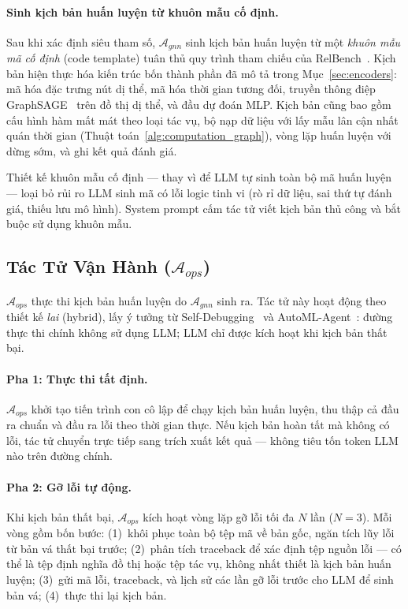 \paragraph{Sinh kịch bản huấn luyện từ khuôn mẫu cố định.}
Sau khi xác định siêu tham số, $\mathcal{A}_{gnn}$ sinh kịch bản huấn luyện từ một \textit{khuôn mẫu mã cố định} (code template) tuân thủ quy trình tham chiếu của RelBench~\cite{robinson2024relbench}. Kịch bản hiện thực hóa kiến trúc bốn thành phần đã mô tả trong Mục~\ref{sec:encoders}: mã hóa đặc trưng nút dị thể, mã hóa thời gian tương đối, truyền thông điệp GraphSAGE~\cite{hamilton2017inductive} trên đồ thị dị thể, và đầu dự đoán MLP. Kịch bản cũng bao gồm cấu hình hàm mất mát theo loại tác vụ, bộ nạp dữ liệu với lấy mẫu lân cận nhất quán thời gian (Thuật toán~\ref{alg:computation_graph}), vòng lặp huấn luyện với dừng sớm, và ghi kết quả đánh giá.

Thiết kế khuôn mẫu cố định --- thay vì để LLM tự sinh toàn bộ mã huấn luyện --- loại bỏ rủi ro LLM sinh mã có lỗi logic tinh vi (rò rỉ dữ liệu, sai thứ tự đánh giá, thiếu lưu mô hình). System prompt cấm tác tử viết kịch bản thủ công và bắt buộc sử dụng khuôn mẫu.

\subsection{Tác Tử Vận Hành ($\mathcal{A}_{ops}$)}
\label{sec:operation-agent}

$\mathcal{A}_{ops}$ thực thi kịch bản huấn luyện do $\mathcal{A}_{gnn}$ sinh ra. Tác tử này hoạt động theo thiết kế \textit{lai} (hybrid), lấy ý tưởng từ Self-Debugging~\cite{chen2024selfdebugging} và AutoML-Agent~\cite{trirat2025automl}: đường thực thi chính không sử dụng LLM; LLM chỉ được kích hoạt khi kịch bản thất bại.

\paragraph{Pha 1: Thực thi tất định.}
$\mathcal{A}_{ops}$ khởi tạo tiến trình con cô lập để chạy kịch bản huấn luyện, thu thập cả đầu ra chuẩn và đầu ra lỗi theo thời gian thực. Nếu kịch bản hoàn tất mà không có lỗi, tác tử chuyển trực tiếp sang trích xuất kết quả --- không tiêu tốn token LLM nào trên đường chính.

\paragraph{Pha 2: Gỡ lỗi tự động.}
Khi kịch bản thất bại, $\mathcal{A}_{ops}$ kích hoạt vòng lặp gỡ lỗi tối đa $N$ lần ($N=3$). Mỗi vòng gồm bốn bước: (1)~khôi phục toàn bộ tệp mã về bản gốc, ngăn tích lũy lỗi từ bản vá thất bại trước; (2)~phân tích traceback để xác định tệp nguồn lỗi --- có thể là tệp định nghĩa đồ thị hoặc tệp tác vụ, không nhất thiết là kịch bản huấn luyện; (3)~gửi mã lỗi, traceback, và lịch sử các lần gỡ lỗi trước cho LLM để sinh bản vá; (4)~thực thi lại kịch bản.

